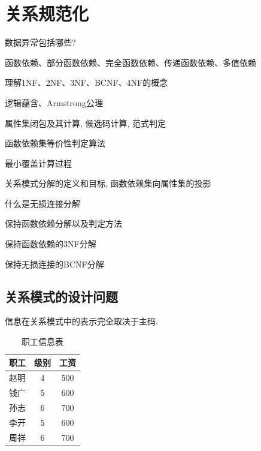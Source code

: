 \chapter{关系规范化}

\begin{introduction}[期末考试提纲]
  \item 数据异常包括哪些?
  \item 函数依赖、部分函数依赖、完全函数依赖、传递函数依赖、多值依赖
  \item 理解1NF、2NF、3NF、BCNF、4NF的概念
  \item 逻辑蕴含、Armstrong公理
  \item 属性集闭包及其计算, 候选码计算, 范式判定
  \item 函数依赖集等价性判定算法
  \item 最小覆盖计算过程
  \item 关系模式分解的定义和目标, 函数依赖集向属性集的投影
  \item 什么是无损连接分解
  \item 保持函数依赖分解以及判定方法
  \item 保持函数依赖的3NF分解
  \item 保持无损连接的BCNF分解
\end{introduction}

\section{关系模式的设计问题}

信息在关系模式中的表示完全取决于主码.

\begin{table}[H]
  \centering
  \begin{tabular}{|c|c|c|}
    \hline
    \textbf{职工} & \textbf{级别} & \textbf{工资} \\
    \hline
    赵明 & 4 & 500 \\
    \hline
    钱广 & 5 & 600 \\
    \hline
    孙志 & 6 & 700 \\
    \hline
    李开 & 5 & 600 \\
    \hline
    周祥 & 6 & 700 \\
    \hline
  \end{tabular}
  \caption{职工信息表}
\end{table}



